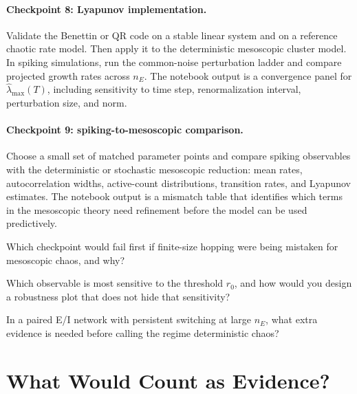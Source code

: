 \paragraph{Checkpoint 8: Lyapunov implementation.}
Validate the Benettin or QR code on a stable linear system and on a reference
chaotic rate model. Then apply it to the deterministic mesoscopic cluster
model. In spiking simulations, run the common-noise perturbation ladder and
compare projected growth rates across \(n_E\). The notebook output is a
convergence panel for \(\widehat\lambda_{\max}(T)\), including sensitivity to
time step, renormalization interval, perturbation size, and norm.

\paragraph{Checkpoint 9: spiking-to-mesoscopic comparison.}
Choose a small set of matched parameter points and compare spiking observables
with the deterministic or stochastic mesoscopic reduction: mean rates,
autocorrelation widths, active-count distributions, transition rates, and
Lyapunov estimates. The notebook output is a mismatch table that identifies
which terms in the mesoscopic theory need refinement before the model can be
used predictively.

\begin{conceptquestions}
    \item Which checkpoint would fail first if finite-size hopping were being
    mistaken for mesoscopic chaos, and why?
    \item Which observable is most sensitive to the threshold \(r_0\), and how
    would you design a robustness plot that does not hide that sensitivity?
    \item In a paired E/I network with persistent switching at large \(n_E\),
    what extra evidence is needed before calling the regime deterministic
    chaos?
\end{conceptquestions}

\section{What Would Count as Evidence?}
\label{sec:ch10-evidence}

